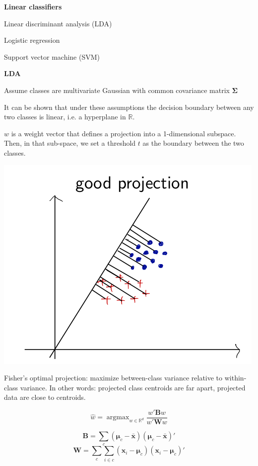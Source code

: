 \documentclass{minimal}
\DeclareMathOperator*{\argmax}{argmax}
\begin{document}
\textbf{Linear classifiers}

Linear discriminant analysis (LDA)

Logistic regression

Support vector machine (SVM)

\medskip

\textbf{LDA}

Assume classes are multivariate Gaussian with common covariance matrix $\mathbf{\Sigma}$

It can be shown that under these assumptions the decision boundary between any
two classes is linear, i.e. a hyperplane in $\mathbb{R}$.

\smallskip

$w$ is a weight vector that defines a projection into a 1-dimensional subspace.
Then, in that sub-space, we set a threshold $t$ as the boundary between the two
classes. 

\includegraphics[scale=0.25]{lda}

Fisher's optimal projection: maximize between-class variance relative
to within-class variance. In other words: projected class centroids are far
apart, projected data are close to centroids.

$$
\hat{w} = \argmax_{w \in \mathbb{R}^d} \frac{w'\mathbf{B}w}{w'\mathbf{W}w}
$$

$$
\mathbf{B} = \sum_c (\bm{\mu}_c - \bar{\mathbf{x}}) (\bm{\mu}_c -
\bar{\mathbf{x}})'
$$
$$
\mathbf{W} = \sum_c \sum_{i \in c}(\mathbf{x}_i - \bm{\mu}_c) (\mathbf{x}_i -
\bm{\mu}_c)'
$$

\smallskip
\end{document}
